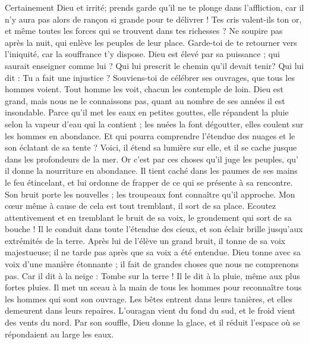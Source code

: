 \begin{multicols}{2}
Certainement Dieu et irrité; prends garde qu'il ne te  plonge dans l'affliction, car il n'y aura pas alors de rançon si grande pour te délivrer !
Tes cris valent-ils ton or, et même toutes les forces qui se trouvent dans tes richesses ?
Ne soupire pas après la nuit, qui enlève les peuples de leur place.
Garde-toi de te retourner vers l'iniquité, car la souffrance t'y dispose.
Dieu est élevé par sa puissance ; qui saurait enseigner comme lui ?
Qui lui prescrit le chemin qu'il devait tenir? Qui lui dit : Tu a fait une injustice ?
Souviens-toi de célébrer ses ouvrages, que tous les hommes voient.
Tout homme les voit, chacun les contemple de loin.
Dieu est grand, mais nous ne le connaissons pas, quant au nombre de ses années il est insondable.
Parce qu'il met les eaux  en petites gouttes, elle répandent la pluie selon la vapeur d'eau qui la contient ;
les nuées la font dégoutter, elles coulent sur les hommes en abondance.
Et qui pourra comprendre l'étendue des nuages et le son éclatant de sa tente ?
Voici, il étend sa lumière sur elle, et il se cache jusque dans les profondeurs de la mer.
 Or c'est par ces choses qu'il juge les peuples, qu' il donne la nourriture en abondance.
 Il tient caché dans les paumes de ses mains le feu étincelant, et lui ordonne de frapper de ce qui se présente à sa rencontre.
 Son bruit porte les nouvelles ; les troupeaux font connaître qu'il approche.
\VerseOne{}Mon cœur même à cause de cela est tout tremblant, il sort de sa place.
Ecoutez attentivement et en tremblant le bruit de sa voix, le grondement qui sort de sa bouche !
Il le conduit dans toute l'étendue des cieux, et son éclair brille jusqu'aux extrémités de la terre.
Après lui de l'élève un grand bruit, il tonne de sa voix majestueuse; il ne tarde pas après que sa voix a été entendue.
Dieu tonne avec sa voix d'une manière étonnante ; il fait de grandes choses que nous ne comprenons pas.
Car il dit à la neige : Tombe sur la terre ! Il le dit à la pluie, même aux plus fortes pluies.
Il met un sceau à la main de tous les hommes pour reconnaître tous les hommes qui sont son ouvrage.
Les bêtes entrent dans leurs tanières, et elles demeurent dans leurs repaires.
L'ouragan vient du fond du sud, et le froid vient des vents du nord.
Par son souffle, Dieu donne la glace, et il réduit l'espace où se répondaient au large les eaux.

\end{multicols}
